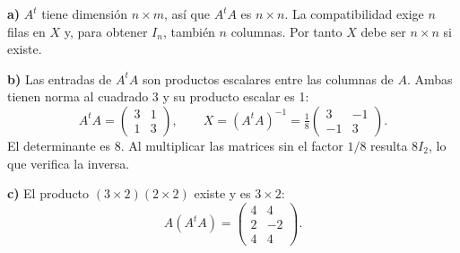 \textbf{a)} $A^t$ tiene dimensión $n\times m$, así que
$A^t A$ es $n\times n$. La compatibilidad exige $n$ filas
en $X$ y, para obtener $I_n$, también $n$ columnas.
Por tanto $X$ debe ser $\boxed{n\times n}$ si existe.

\textbf{b)} Las entradas de $A^t A$ son productos escalares
entre las columnas de $A$. Ambas tienen norma al cuadrado 3
y su producto escalar es 1:
\[
A^t A=\begin{pmatrix}3&1\\1&3\end{pmatrix},\qquad
X=(A^t A)^{-1}=\boxed{\tfrac18\begin{pmatrix}3&-1\\-1&3\end{pmatrix}}.
\]
El determinante es 8. Al multiplicar las matrices sin el factor
$1/8$ resulta $8I_2$, lo que verifica la inversa.

\textbf{c)} El producto $(3\times2)(2\times2)$ existe y es $3\times2$:
\[
A(A^t A)=\boxed{\begin{pmatrix}4&4\\2&-2\\4&4\end{pmatrix}}.
\]
